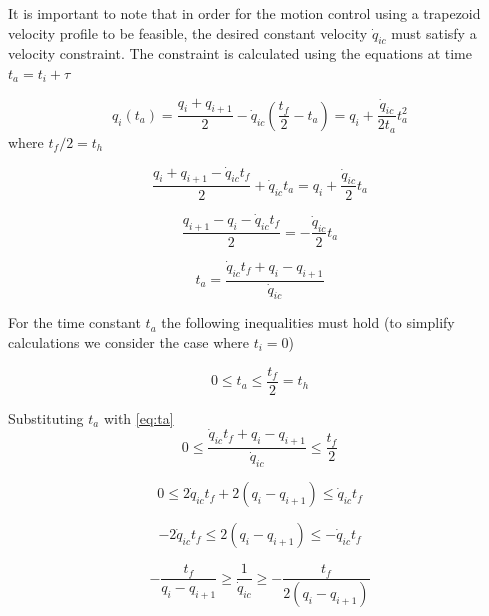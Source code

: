 It is important to note that in order for the motion control using a trapezoid velocity profile to be feasible, the desired constant velocity $\dot{q}_{ic}$ must satisfy a velocity constraint. The constraint is 
calculated using the equations at time $t_a = t_i + τ$

\begin{equation}
q_i(t_a) = \frac{q_i + q_{i+1}}{2} - \dot{q}_{ic} \left( \frac{t_f}{2} - t_a \right) = q_i + \frac{\dot{q}_{ic}}{2t_a}t_a^2
\end{equation}
where $t_f/2 = t_h$

\begin{equation}
\frac{q_i + q_{i+1} - \dot{q}_{ic}t_f}{2} + \dot{q}_{ic}t_a = q_i + \frac{\dot{q}_{ic}}{2}t_a
\end{equation}

\begin{equation}
\frac{q_{i+1} - q_i - \dot{q}_{ic}t_f}{2} = -\frac{\dot{q}_{ic}}{2}t_a
\end{equation}

\begin{equation}
\label{eq:ta}
t_a = \frac{\dot{q}_{ic}t_f + q_i - q_{i+1}}{\dot{q}_{ic}}
\end{equation}

For the time constant $t_a$ the following inequalities must hold (to simplify calculations we consider the case where $t_i = 0$)

\begin{equation}
0 \leq t_a \leq \frac{t_f}{2} = t_h
\end{equation}

Substituting $t_a$ with \ref{eq:ta}
\begin{equation}
0 \leq \frac{\dot{q}_{ic}t_f + q_i - q_{i+1}}{\dot{q}_{ic}} \leq \frac{t_f}{2}
\end{equation}

\begin{equation}
0 \leq 2\dot{q}_{ic}t_f + 2(q_i-q_{i+1}) \leq \dot{q}_{ic}t_f
\end{equation}

\begin{equation}
-2\dot{q}_{ic}t_f \leq 2(q_i - q_{i+1}) \leq -\dot{q}_{ic}t_f
\end{equation}

\begin{equation}
- \frac{t_f}{q_i - q_{i+1}} \geq \frac{1}{\dot{q}_{ic}} \geq -\frac{t_f}{2(q_i - q_{i+1})}
\end{equation}


